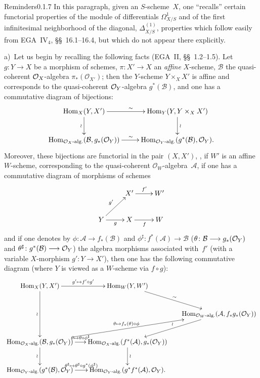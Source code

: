 \begin{enoncerm}{Reminders}{0.1.7}
\label{III.0.1.7}
{\renewcommand{\thefootnote}{(11)}}%
In this paragraph, given an \(S\)-scheme~\(X\), one ``recalls'' certain
functorial properties of the module of differentials
\(\Omega^1_{X/S}\) and of the first infinitesimal neighborhood of the
diagonal, \(\Delta^{(1)}_{X/S}\), properties which follow easily from
EGA~\(\mathrm{IV}_{4}\), \S\S~16.1--16.4, but which do not appear there
explicitly.

a)~Let us begin by recalling the following facts (\cf EGA~II,
\S\S~1.2--1.5). Let \(g\colon Y\to X\) be a morphism of schemes,
\(\pi\colon X'\to X\) an \emph{affine} \(X\)-scheme, \(\mathcal{B}\) the
quasi-coherent \(\mathcal{O}_X\)-algebra \(\pi_{*}(\mathcal{O}_{X'})\); then the
\(Y\)-scheme \(Y\times_X X'\) is affine and corresponds to the
quasi-coherent \(\mathcal{O}_Y\)-algebra \(g^{*}(\mathcal{B})\), and one has a
commutative diagram of bijections:
\[
\xymatrix{
\Hom_X(Y,X') \ar[r]^{\sim} \ar[d]_{\wr}
  & \Hom_Y(Y,Y\times_X X') \ar[d]^{\wr} \\
\Hom_{\OX\text{-alg.}}(\mathcal{B},g_{*}(\OY)) \ar[r]^{\sim}
  & \Hom_{\OY\text{-alg.}}(g^{*}(\mathcal{B}),\OY).
}
\]
Moreover, these bijections are functorial in the pair \((X,X')\),
\ie, if \(W'\) is an affine \(W\)-scheme, corresponding to the
quasi-coherent \(\mathcal{O}_W\)-algebra~\(\mathcal{A}\), if one has a
commutative diagram of morphisms of schemes
\[
\xymatrix{
& X' \ar[r]^{f'} & W' \\
Y \ar[ur]^{g'} \ar[r]_{g} & X \ar[r]_{f} & W
}
\]
and if one denotes by \(\phi\colon\mathcal{A}\to f_{*}(\mathcal{B})\) and
\(\phi^{\sharp}\colon f^{*}(\mathcal{A})\to\mathcal{B}\)
(\resp \(\theta\colon\mathcal{B}\longrightarrow g_{*}(\mathcal{O}_Y)\) and
\(\theta^{\sharp}\colon g^{*}(\mathcal{B})\longrightarrow\mathcal{O}_Y\)) the algebra morphisms
associated with~\(f'\) (\resp with a variable \(X\)-morphism
\(g'\colon Y\to X'\)), then one has the following commutative diagram
(where \(Y\) is viewed as a \(W\)-scheme via \(f\circ g\)):
\[
\xymatrix@C=1.6em@R=2.6em{
\Hom_X(Y,X') \ar[r]^-{g'\mapsto f'\circ g'} \ar[dd]_{\wr}
  & \Hom_W(Y,W') \ar[dr]^{\sim}
  & \\
&
  & \Hom_{\mathcal{O}_W\text{-alg.}}(\mathcal{A},f_{*}g_{*}(\OY))
    \ar[dl]_{\wr} \\
\Hom_{\OX\text{-alg.}}(\mathcal{B},g_{*}(\OY))
  \ar[r]^-{\theta\mapsto\theta\circ\phi^{\sharp}}
  \ar[d]_{\wr}
  \ar[urr]^-{\theta\mapsto f_{*}(\theta)\circ\phi}
  & \Hom_{\OX\text{-alg.}}(f^{*}(\mathcal{A}),g_{*}(\OY)) \ar[d]^{\wr}
  & \\
\Hom_{\OY\text{-alg.}}(g^{*}(\mathcal{B}),\OY)
  \ar[r]^-{\theta^{\sharp}\mapsto\theta^{\sharp}\circ g^{*}(\phi^{\sharp})}
  & \Hom_{\OY\text{-alg.}}(g^{*}f^{*}(\mathcal{A}),\OY).
  &
}
\]


\end{enoncerm}
